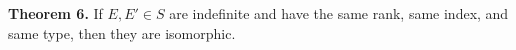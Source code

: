 \textbf{Theorem 6.} If $E, E' \in S$ are indefinite and have the same rank, same index, and same type, then they are isomorphic.
